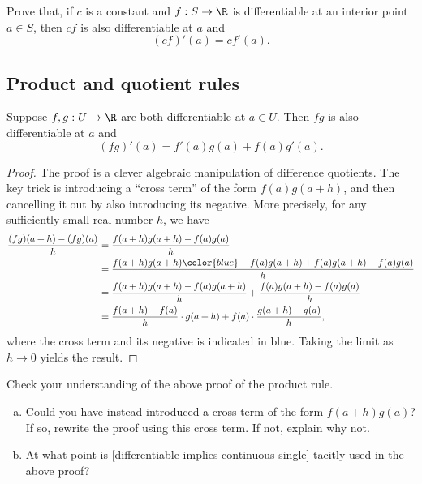 \begin{exercise} \label{scalar-multiples-rule-single}
	Prove that, if $c$ is a constant and $f : S \to \R$ is differentiable at an interior point $a \in S$, then $cf$ is also differentiable at $a$ and \[ (cf)'(a) = c f'(a). \]
\end{exercise}

\subsection{Product and quotient rules}

\begin{proposition} \label{product-rule}
	Suppose $f, g : U \to \R$ are both differentiable at $a \in U$. Then $fg$ is also differentiable at $a$ and 
	\[ (fg)'(a) = f'(a)g(a) + f(a)g'(a). \]
\end{proposition}

\begin{proof}
	The proof is a clever algebraic manipulation of difference quotients. The key trick is introducing a ``cross term'' of the form $f(a)g(a+h)$, and then cancelling it out by also introducing its negative. More precisely, for any sufficiently small real number $h$, we have 
	\[ \begin{aligned} \frac{(fg)(a+h)-(fg)(a)}{h} &= \frac{f(a+h)g(a+h) - f(a)g(a)}{h} \\ 
	&= \frac{f(a+h)g(a+h) {\color{blue}-f(a)g(a+h) + f(a)g(a+h)} - f(a)g(a)}{h} \\
	&= \frac{f(a+h)g(a+h) - f(a)g(a+h)}{h} + \frac{f(a)g(a+h) - f(a)g(a)}{h} \\
	&= \frac{f(a+h) - f(a)}{h} \cdot g(a+h) + f(a) \cdot \frac{g(a+h) - g(a)}{h}, \end{aligned} \]
	where the cross term and its negative is indicated in blue. 
	Taking the limit as $h \to 0$ yields the result. 
\end{proof}

\begin{exercise}
	Check your understanding of the above proof of the product rule. 
\begin{enumerate}[(a)]
	\item Could you have instead introduced a cross term of the form $f(a+h)g(a)$? If so, rewrite the proof using this cross term. If not, explain why not. 
	\item At what point is \cref{differentiable-implies-continuous-single} tacitly used in the above proof?
\end{enumerate}
\end{exercise}

